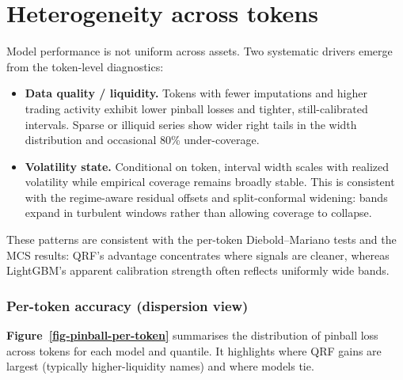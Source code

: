 \documentclass[
  a4paper,
  DIV=11,
  numbers=noendperiod]{scrreprt}
\begin{document}
\section{Heterogeneity across tokens}\label{heterogeneity-across-tokens}

Model performance is not uniform across assets. Two systematic drivers
emerge from the token-level diagnostics:

\begin{itemize}
\item
  \textbf{Data quality / liquidity.} Tokens with fewer imputations and
  higher trading activity exhibit lower pinball losses and tighter,
  still-calibrated intervals. Sparse or illiquid series show wider right
  tails in the width distribution and occasional 80\% under-coverage.
\item
  \textbf{Volatility state.} Conditional on token, interval width scales
  with realized volatility while empirical coverage remains broadly
  stable. This is consistent with the regime-aware residual offsets and
  split-conformal widening: bands expand in turbulent windows rather
  than allowing coverage to collapse.
\end{itemize}

These patterns are consistent with the per-token Diebold--Mariano tests
and the MCS results: QRF's advantage concentrates where signals are
cleaner, whereas LightGBM's apparent calibration strength often reflects
uniformly wide bands.

\subsubsection{Per-token accuracy (dispersion
view)}\label{per-token-accuracy-dispersion-view}

\textbf{Figure~\ref{fig-pinball-per-token}} summarises the distribution
of pinball loss across tokens for each model and quantile. It highlights
where QRF gains are largest (typically higher-liquidity names) and where
models tie.
\end{document}
